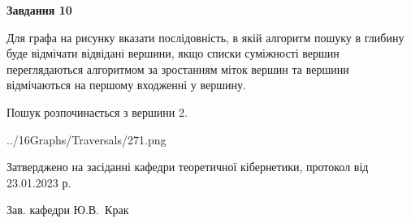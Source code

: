 \documentclass[12pt, ukrainian]{article}
\begin{document}
{\begin {large}
{\begin {center}\textbf{Завдання 10}\end {center}}\par
Для графа на рисунку вказати послідовність, в якій алгоритм пошуку в глибину буде відмічати відвідані вершини, якщо списки суміжності вершин переглядаються алгоритмом за зростанням міток вершин та вершини відмічаються на першому вход\-женні у вершину.\par
Пошук розпочинається з вершини 2.\par

\begin{center}
	{../16Graphs/Traversals/271.png}
\end{center}\par
\newpage


\end {large}
}
{\smallskip \begin {small} Затверджено на засіданні кафедри теоретичної кібернетики, протокол  від   23.01.2023 р.\par\smallskip\smallskip
{\parbox {6.5 cm}{Зав. кафедри \dotfill Ю.В.~Крак}} \end{small}}
\end{document}
